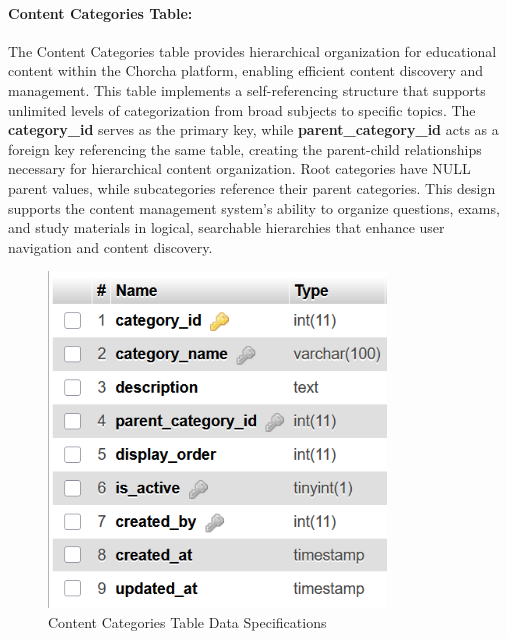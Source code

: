 \documentclass[12pt,a4paper,oneside]{book}
\begin{document}
\paragraph{Content Categories Table:}
The Content Categories table provides hierarchical organization for educational content within the Chorcha platform, enabling efficient content discovery and management. This table implements a self-referencing structure that supports unlimited levels of categorization from broad subjects to specific topics. The \textbf{category\_id} serves as the primary key, while \textbf{parent\_category\_id} acts as a foreign key referencing the same table, creating the parent-child relationships necessary for hierarchical content organization. Root categories have NULL parent values, while subcategories reference their parent categories. This design supports the content management system's ability to organize questions, exams, and study materials in logical, searchable hierarchies that enhance user navigation and content discovery.

\begin{figure}[H]
\centering
\includegraphics[width=0.8\textwidth]{assets/DBTable/Table4.4.png}
\caption{Content Categories Table Data Specifications}
\label{table:content_categories}
\end{figure}

\clearpage
\end{document}
